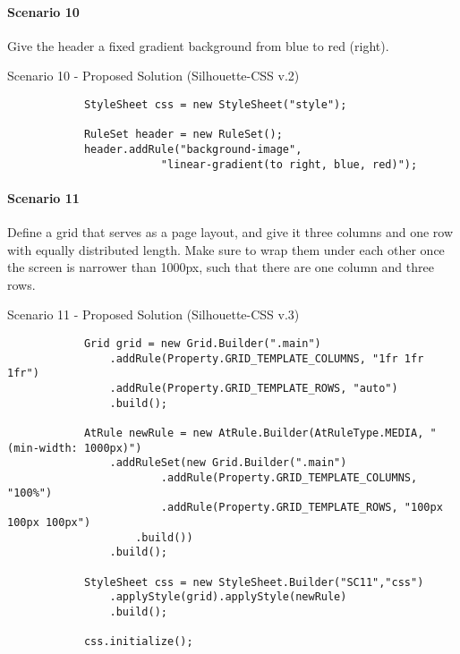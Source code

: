 \documentclass[12pt]{article}
\begin{document}
        \paragraph{Scenario 10}
        Give the header a fixed gradient background from blue to red (right).

        \begin{shaded}
        Scenario 10 - Proposed Solution (Silhouette-CSS v.2)
            \begin{lstlisting}
            StyleSheet css = new StyleSheet("style");

            RuleSet header = new RuleSet();
            header.addRule("background-image",
                        "linear-gradient(to right, blue, red)");
            \end{lstlisting}
        \end{shaded}

        \paragraph{Scenario 11}
        Define a grid that serves as a page layout, and give it three columns and one row with equally distributed length. Make sure to wrap them under each other once the screen is narrower than 1000px, such that there are one column and three rows.

        \begin{shaded}
            Scenario 11 - Proposed Solution (Silhouette-CSS v.3)
            \begin{lstlisting}
            Grid grid = new Grid.Builder(".main")
                .addRule(Property.GRID_TEMPLATE_COLUMNS, "1fr 1fr 1fr")
                .addRule(Property.GRID_TEMPLATE_ROWS, "auto")
                .build();

            AtRule newRule = new AtRule.Builder(AtRuleType.MEDIA, "(min-width: 1000px)")
                .addRuleSet(new Grid.Builder(".main")
                        .addRule(Property.GRID_TEMPLATE_COLUMNS, "100%")
                        .addRule(Property.GRID_TEMPLATE_ROWS, "100px 100px 100px")
                    .build())
                .build();

            StyleSheet css = new StyleSheet.Builder("SC11","css")
                .applyStyle(grid).applyStyle(newRule)
                .build();

            css.initialize();
            \end{lstlisting}
        \end{shaded}
\end{document}
